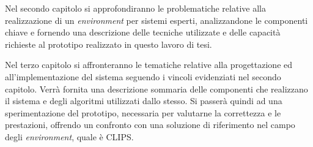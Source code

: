 Nel secondo capitolo si approfondiranno le problematiche relative alla realizzazione di un \emph{environment} per sistemi esperti, analizzandone le componenti chiave e fornendo una descrizione delle tecniche utilizzate e delle capacità richieste al prototipo realizzato in questo lavoro di tesi.

Nel terzo capitolo  si affronteranno le tematiche relative alla progettazione ed all'implementazione del sistema seguendo i vincoli evidenziati nel secondo capitolo. Verrà fornita una descrizione sommaria delle componenti che realizzano il sistema e degli algoritmi utilizzati dallo stesso. Si passerà quindi ad una sperimentazione del prototipo, necessaria per valutarne la correttezza e le prestazioni, offrendo un confronto con una soluzione di riferimento nel campo degli \emph{environment}, quale è CLIPS.